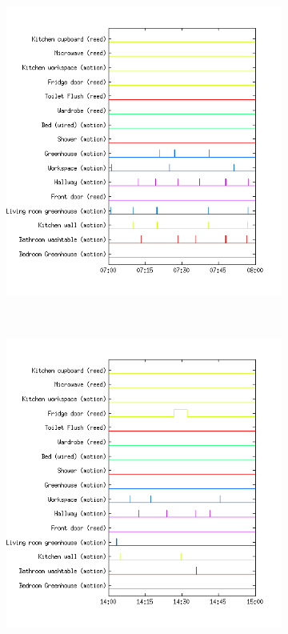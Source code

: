 \documentclass[11pt,a4paper]{article}
\begin{document}
\begin{figure}[h!]
  \centering
  \begin{subfigure}[b]{0.45\textwidth}
    \centering
    \includegraphics[width=\textwidth]{Pictures/SensorsMorningHN3Day34.png}
  \end{subfigure}
  ~
  \begin{subfigure}[b]{0.45\textwidth}
    \centering
    \includegraphics[width=\textwidth]{Pictures/SensorsNoonHN3Day34.png}

\end{subfigure}
\end{figure}
\end{document}
